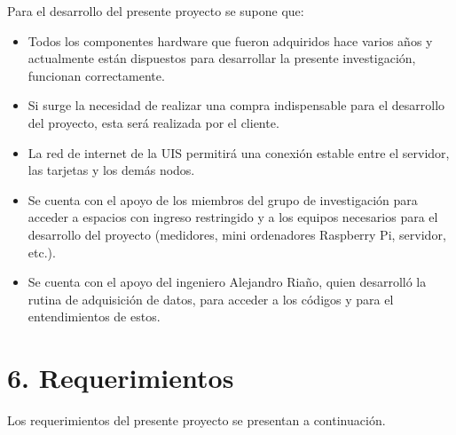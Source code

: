 \documentclass[
11pt, %
codirector, %
]{charter}
\begin{document}
Para el desarrollo del presente proyecto se supone que:

\begin{itemize}

    \item Todos los componentes hardware que fueron adquiridos hace varios años y actualmente están dispuestos para desarrollar la presente investigación, funcionan correctamente.

    \item Si surge la necesidad de realizar una compra indispensable para el desarrollo del proyecto, esta será realizada por el cliente.
    
    \item La red de internet de la UIS permitirá una conexión estable entre el servidor, las tarjetas y los demás nodos.
    
	\item Se cuenta con el apoyo de los miembros del grupo de investigación para acceder a espacios con ingreso restringido y a los equipos necesarios para el desarrollo del proyecto (medidores, mini ordenadores Raspberry Pi, servidor, etc.).
	
	\item Se cuenta con el apoyo del ingeniero Alejandro Riaño, quien desarrolló la rutina de adquisición de datos, para acceder a los códigos y para el entendimientos de estos.
	
\end{itemize}


\section{6. Requerimientos}
\label{sec:requerimientos}


Los requerimientos del presente proyecto se presentan a continuación.
\end{document}
